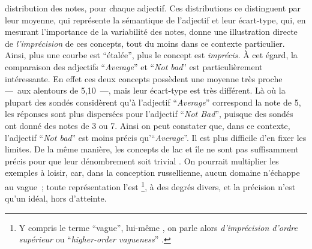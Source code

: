 distribution des notes, pour chaque adjectif. Ces distributions ce
distinguent par leur moyenne, qui représente la sémantique de
l'adjectif et leur écart-type, qui, en mesurant l'importance de la
variabilité des notes, donne une illustration directe de
\emph{l'imprécision} de ces concepts, tout du moins dans ce contexte
particulier. Ainsi, plus une courbe est \enquote{étalée}, plus le
concept est \emph{imprécis.} À cet égard, la comparaison des adjectifs
\foreignquote{english}{\emph{Average}} et
\foreignquote{english}{\emph{Not bad}} est particulièrement
intéressante. En effet ces deux concepts possèdent une moyenne très
proche ---~aux alentours de 5,10~---, mais leur écart-type est très
différent. Là où la plupart des sondés considèrent qu'à l'adjectif
\foreignquote{english}{\emph{Average}} correspond la note de 5, les
réponses sont plus dispersées pour l'adjectif
\foreignquote{english}{\emph{Not Bad}}, puisque des sondés ont donné
des notes de 3 ou 7. Ainsi on peut constater que, dans ce contexte,
l'adjectif \foreignquote{english}{\emph{Not bad}} est moins précis
qu'\foreignquote{english}{\emph{Average}}. Il est plus difficile d'en
fixer les limites.  De la même manière, les concepts de lac et île ne
sont pas suffisamment précis pour que leur dénombrement soit trivial
\autocite{Sarjakoski1996}. On pourrait multiplier les exemples à
loisir, car, dans la conception russellienne, aucun domaine n’échappe
au vague ; toute représentation l’est \footnote{Y compris le terme
  \enquote{vague}, lui-même \autocite{Russell1923}, on parle alors
  \emph{d’imprécision d’ordre supérieur} ou
  \foreignquote{english}{\emph{higher-order vagueness}}
  \autocite{Williamson1994}.}, à des degrés divers, et la précision
n’est qu’un idéal, hors d’atteinte.

